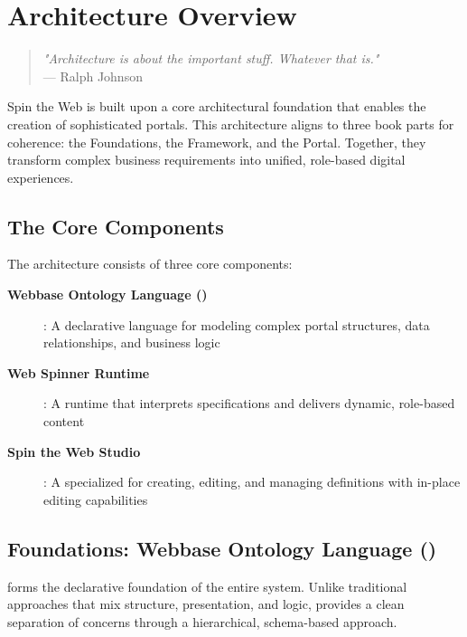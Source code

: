 
\chapter{Architecture Overview}
\label{chap:architecture}

\begin{quote}
\textit{"Architecture is about the important stuff. Whatever that is."} \\
— Ralph Johnson
\end{quote}

Spin the Web is built upon a core architectural foundation that enables the creation of sophisticated portals. This architecture aligns to three book parts for coherence: the Foundations, the Framework, and the Portal. Together, they transform complex business requirements into unified, role-based digital experiences.

\section{The Core Components}
\label{sec:core-components}

The architecture consists of three core components:

\begin{description}
\item[\textbf{Webbase Ontology Language (\wbol{})}]: A declarative language for modeling complex portal structures, data relationships, and business logic
\item[\textbf{Web Spinner Runtime}]: A runtime that interprets \wbol{} specifications and delivers dynamic, role-based content
\item[\textbf{Spin the Web Studio}]: A specialized \webbaselet{} for creating, editing, and managing \webbase{} definitions with in-place editing capabilities
\end{description}

\section{Foundations: Webbase Ontology Language (\wbol{})}
\label{sec:blueprint-wbol}

\wbol{} forms the declarative foundation of the entire system. Unlike traditional approaches that mix structure, presentation, and logic, \wbol{} provides a clean separation of concerns through a hierarchical, schema-based approach.

